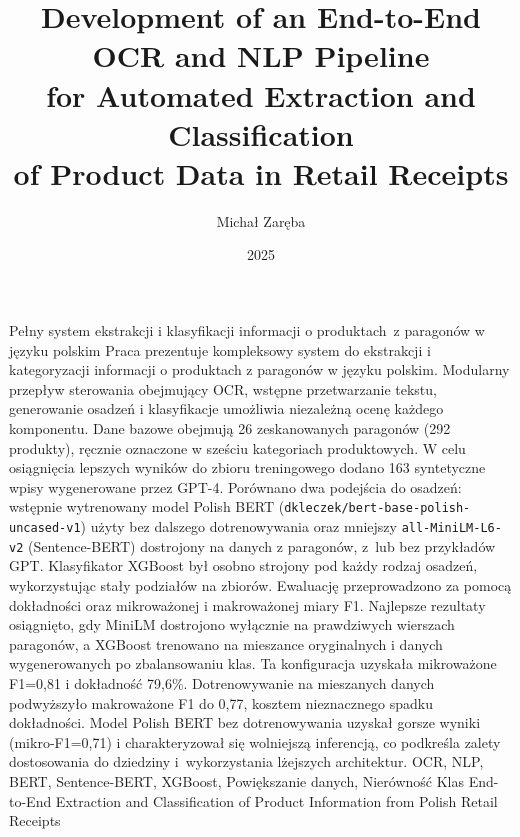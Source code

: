 \documentclass{SGGW-thesis-EN}
\title{Development of an End-to-End\\ OCR and NLP Pipeline\\ for Automated Extraction and Classification\\ of Product Data in Retail Receipts}
\author{Michał Zaręba}
\date{2025}
\begin{document}
\maketitle
\statementpage
\abstractpage
{Pełny system ekstrakcji i klasyfikacji informacji o produktach~z paragonów w języku polskim}
{Praca prezentuje kompleksowy system do ekstrakcji i kategoryzacji informacji o produktach z paragonów w języku polskim. 
Modularny przepływ sterowania obejmujący OCR, wstępne przetwarzanie tekstu, generowanie osadzeń i klasyfikacje umożliwia niezależną ocenę każdego komponentu. 
Dane bazowe obejmują 26 zeskanowanych paragonów (292 produkty), ręcznie oznaczone w sześciu kategoriach produktowych. 
W celu osiągnięcia lepszych wyników do zbioru treningowego dodano 163 syntetyczne wpisy wygenerowane przez GPT-4.
Porównano dwa podejścia do osadzeń: wstępnie wytrenowany model Polish BERT (\texttt{dkleczek/bert-base-polish-uncased-v1}) użyty bez dalszego dotrenowywania
oraz mniejszy \texttt{all-MiniLM-L6-v2} (Sentence-BERT) dostrojony na danych z paragonów, z~lub bez przykładów GPT.
Klasyfikator XGBoost był osobno strojony pod każdy rodzaj osadzeń, wykorzystując stały podziałów na zbiorów. 
Ewaluację przeprowadzono za pomocą dokładności oraz mikroważonej i makroważonej miary F1.
Najlepsze rezultaty osiągnięto, gdy MiniLM dostrojono wyłącznie na prawdziwych wierszach paragonów, 
a XGBoost trenowano na mieszance oryginalnych i danych wygenerowanych po zbalansowaniu klas. Ta konfiguracja uzyskała mikroważone F1=0,81 i dokładność 79,6\%. 
Dotrenowywanie na mieszanych danych podwyższyło makroważone F1 do 0,77, kosztem nieznacznego spadku dokładności.
Model Polish BERT bez dotrenowywania uzyskał gorsze wyniki (mikro-F1=0,71) i charakteryzował się wolniejszą inferencją, 
co podkreśla zalety dostosowania do dziedziny i~wykorzystania lżejszych architektur.}
{OCR, NLP, BERT, Sentence-BERT, XGBoost, Powiększanie danych, Nierówność Klas}
{End-to-End Extraction and Classification of Product Information from Polish Retail Receipts}
\end{document}
